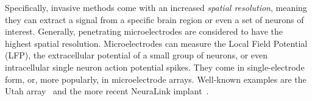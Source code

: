 
Specifically, invasive methods come with an increased \emph{spatial resolution},
meaning they can extract a signal from a specific brain region or even a set of
neurons of interest.
Generally, penetrating microelectrodes are considered to have the highest
spatial resolution.
Microelectrodes can measure the Local Field Potential (LFP), the extracellular
potential of a small group of neurons, or even intracellular single neuron
action potential spikes.
They come in single-electrode form, or, more popularly, in microelectrode
arrays.
Well-known examples are the Utah array~\cite{Maynard1997} and the more recent
NeuraLink implant~\cite{Musk2019}.

